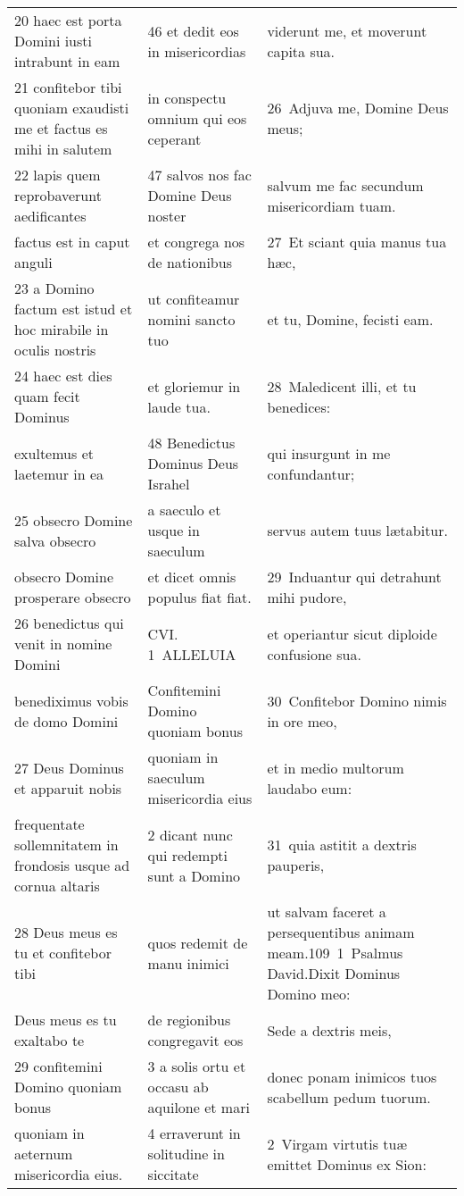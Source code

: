 \documentclass{article}
\begin{document}
\begin{longtable}{@{}p{}p{}p{}@{}}
20 haec est porta Domini iusti intrabunt in eam	&	46 et dedit eos in misericordias	&	viderunt me, et moverunt capita sua.	\\
21 confitebor tibi quoniam exaudisti me et factus es mihi in salutem	&	in conspectu omnium qui eos ceperant	&	26 Adjuva me, Domine Deus meus;	\\
22 lapis quem reprobaverunt aedificantes	&	47 salvos nos fac Domine Deus noster	&	salvum me fac secundum misericordiam tuam.	\\
factus est in caput anguli	&	et congrega nos de nationibus	&	27 Et sciant quia manus tua hæc,	\\
23 a Domino factum est istud et hoc mirabile in oculis nostris	&	ut confiteamur nomini sancto tuo	&	et tu, Domine, fecisti eam.	\\
24 haec est dies quam fecit Dominus	&	et gloriemur in laude tua.	&	28 Maledicent illi, et tu benedices:	\\
exultemus et laetemur in ea	&	48 Benedictus Dominus Deus Israhel	&	qui insurgunt in me confundantur;	\\
25 obsecro Domine salva obsecro	&	a saeculo et usque in saeculum	&	servus autem tuus lætabitur.	\\
obsecro Domine prosperare obsecro	&	et dicet omnis populus fiat fiat.	&	29 Induantur qui detrahunt mihi pudore,	\\
26 benedictus qui venit in nomine Domini	&	CVI. 1 ALLELUIA	&	et operiantur sicut diploide confusione sua.	\\
benediximus vobis de domo Domini	&	Confitemini Domino quoniam bonus	&	30 Confitebor Domino nimis in ore meo,	\\
27 Deus Dominus et apparuit nobis	&	quoniam in saeculum misericordia eius	&	et in medio multorum laudabo eum:	\\
frequentate sollemnitatem in frondosis usque ad cornua altaris	&	2 dicant nunc qui redempti sunt a Domino	&	31 quia astitit a dextris pauperis,	\\
28 Deus meus es tu et confitebor tibi	&	quos redemit de manu inimici	&	ut salvam faceret a persequentibus animam meam.109 1 Psalmus David.Dixit Dominus Domino meo:	\\
Deus meus es tu exaltabo te	&	de regionibus congregavit eos	&	Sede a dextris meis,	\\
29 confitemini Domino quoniam bonus	&	3 a solis ortu et occasu ab aquilone et mari	&	donec ponam inimicos tuos scabellum pedum tuorum.	\\
quoniam in aeternum misericordia eius.	&	4 erraverunt in solitudine in siccitate	&	2 Virgam virtutis tuæ emittet Dominus ex Sion:	\\

\end{longtable}
\end{document}
